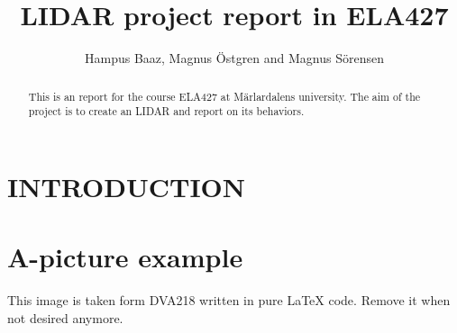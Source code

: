 
\title{\LARGE \bf
LIDAR project report in ELA427}
\author{Hampus Baaz, Magnus \"{O}stgren and Magnus S\"{o}rensen }


\maketitle
\thispagestyle{empty}
\pagestyle{empty}

\begin{abstract}
This is an report for the course ELA427 at M\"{a}rlardalens university. The aim of the project is to create an LIDAR and report on its behaviors.
\end{abstract}


\section{INTRODUCTION}


\section{A-picture example}
This image is taken form DVA218 written in pure LaTeX code. Remove it when not desired anymore. 



\printbibliography
